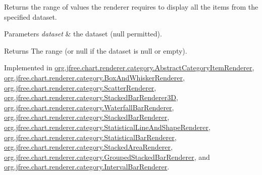 Returns the range of values the renderer requires to display all the items from the specified dataset.


\begin{DoxyParams}{Parameters}
{\em dataset} & the dataset ({\ttfamily null} permitted).\\
\hline
\end{DoxyParams}
\begin{DoxyReturn}{Returns}
The range (or {\ttfamily null} if the dataset is {\ttfamily null} or empty). 
\end{DoxyReturn}


Implemented in \mbox{\hyperlink{classorg_1_1jfree_1_1chart_1_1renderer_1_1category_1_1_abstract_category_item_renderer_aba6ace35854f96515fecf819b4fa20f7}{org.\+jfree.\+chart.\+renderer.\+category.\+Abstract\+Category\+Item\+Renderer}}, \mbox{\hyperlink{classorg_1_1jfree_1_1chart_1_1renderer_1_1category_1_1_box_and_whisker_renderer_a75d2ee53086dc5242430580069ab9370}{org.\+jfree.\+chart.\+renderer.\+category.\+Box\+And\+Whisker\+Renderer}}, \mbox{\hyperlink{classorg_1_1jfree_1_1chart_1_1renderer_1_1category_1_1_scatter_renderer_aad055a28692567ef338b494aac70bb62}{org.\+jfree.\+chart.\+renderer.\+category.\+Scatter\+Renderer}}, \mbox{\hyperlink{classorg_1_1jfree_1_1chart_1_1renderer_1_1category_1_1_stacked_bar_renderer3_d_ad39b42b0bade58899ae7087a7025bc3f}{org.\+jfree.\+chart.\+renderer.\+category.\+Stacked\+Bar\+Renderer3D}}, \mbox{\hyperlink{classorg_1_1jfree_1_1chart_1_1renderer_1_1category_1_1_waterfall_bar_renderer_a851bbbf10211f21c9c6f105b5f511baf}{org.\+jfree.\+chart.\+renderer.\+category.\+Waterfall\+Bar\+Renderer}}, \mbox{\hyperlink{classorg_1_1jfree_1_1chart_1_1renderer_1_1category_1_1_stacked_bar_renderer_a46a38af7e1841b7c0259f5ef4a7f1a24}{org.\+jfree.\+chart.\+renderer.\+category.\+Stacked\+Bar\+Renderer}}, \mbox{\hyperlink{classorg_1_1jfree_1_1chart_1_1renderer_1_1category_1_1_statistical_line_and_shape_renderer_a3fd2f24f87b901eceec2f29e1a77ba3b}{org.\+jfree.\+chart.\+renderer.\+category.\+Statistical\+Line\+And\+Shape\+Renderer}}, \mbox{\hyperlink{classorg_1_1jfree_1_1chart_1_1renderer_1_1category_1_1_statistical_bar_renderer_a73c393df8708c42a18167f1d800dc816}{org.\+jfree.\+chart.\+renderer.\+category.\+Statistical\+Bar\+Renderer}}, \mbox{\hyperlink{classorg_1_1jfree_1_1chart_1_1renderer_1_1category_1_1_stacked_area_renderer_abdb1c576d27ce382c8edcc957b7d26ba}{org.\+jfree.\+chart.\+renderer.\+category.\+Stacked\+Area\+Renderer}}, \mbox{\hyperlink{classorg_1_1jfree_1_1chart_1_1renderer_1_1category_1_1_grouped_stacked_bar_renderer_a9a3d50c3fc42ee4252cbb00563b3421e}{org.\+jfree.\+chart.\+renderer.\+category.\+Grouped\+Stacked\+Bar\+Renderer}}, and \mbox{\hyperlink{classorg_1_1jfree_1_1chart_1_1renderer_1_1category_1_1_interval_bar_renderer_a5b0123164b3c4c4e88b0e844d0503ed8}{org.\+jfree.\+chart.\+renderer.\+category.\+Interval\+Bar\+Renderer}}.

